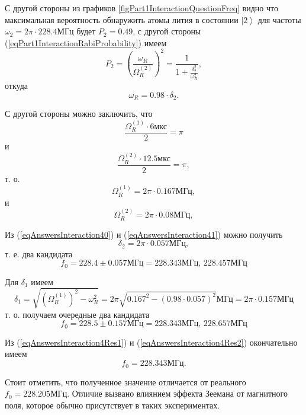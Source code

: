 С другой стороны из графиков
\autoref{figPart1InteractionQuestionFreq} видно что максимальная
вероятность обнаружить атомы лития в состоянии $\left|2\right>$ для
частоты $\omega_2 = 2 \pi \cdot 228.4 \mbox{МГц}$ будет $P_2 = 0.49$,
с другой стороны (\ref{eqPart1InteractionRabiProbability}) имеем
\begin{equation}
  P_2 = \left(\frac{\omega_R}{\Omega_R^{(2)}}\right)^2 =
  \frac{1}{1 + \frac{\delta_2^2}{\omega_R^2}},
  \nonumber
\end{equation}
откуда
\begin{equation}
  \omega_R = 0.98 \cdot \delta_2 .
  \label{eqAnswersInteraction41}
\end{equation}

С другой стороны можно заключить, что
\[
\frac{\Omega_R^{(1)} \cdot 6 \mbox{мкс}}{2} = \pi
\]
и
\[
\frac{\Omega_R^{(2)} \cdot 12.5 \mbox{мкс}}{2} = \pi,
\]
т. о.
\[
\Omega_R^{(1)} = 2 \pi \cdot 0.167 \mbox{МГц},
\]
и
\[
\Omega_R^{(2)} = 2 \pi \cdot 0.08 \mbox{МГц},
\]

Из (\ref{eqAnswersInteraction40}) и  (\ref{eqAnswersInteraction41})
можно получить
\[
\delta_2 = 2 \pi \cdot 0.057 \mbox{МГц},
\]
т. е. два кандидата
\begin{equation}
  f_0 = 228.4 \pm 0.057 \mbox{МГц} = 228.343 \mbox{МГц},\,
  228.457 \mbox{МГц} 
\label{eqAnswersInteraction4Res1}
\end{equation}

Для $\delta_1$ имеем
\[
\delta_1 = \sqrt{\left(\Omega_R^{(1)}\right)^2 - \omega_R^2} =
2 \pi \sqrt{0.167^2 - (0.98 \cdot 0.057)^2} \mbox{МГц} =
2 \pi \cdot 0.157 \mbox{МГц}
\]
т. о. получаем очередные два кандидата
\begin{equation}
  f_0 = 228.5 \pm 0.157 \mbox{МГц} = 228.343 \mbox{МГц},\,
  228.657 \mbox{МГц} 
\label{eqAnswersInteraction4Res2}
\end{equation}

Из (\ref{eqAnswersInteraction4Res1}) и
(\ref{eqAnswersInteraction4Res2}) окончательно имеем
\[
f_0 = 228.343 \mbox{МГц}.
\]

Стоит отметить, что полученное значение отличается от реального $f_0 =
228.205 \mbox{МГц}$. Отличие вызвано влиянием эффекта Зеемана от
магнитного поля, которое обычно присутствует в таких экспериментах.



